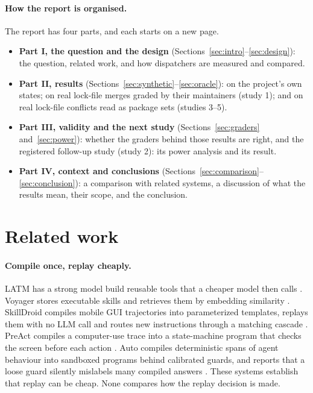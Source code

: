 \documentclass[11pt]{article}
\begin{document}
\paragraph{How the report is organised.}
The report has four parts, and each starts on a new page.
\begin{itemize}
  \item \textbf{Part I, the question and the design} (Sections~\ref{sec:intro}--\ref{sec:design}):
  the question, related work, and how dispatchers are measured and compared.
  \item \textbf{Part II, results} (Sections~\ref{sec:synthetic}--\ref{sec:oracle}): on the
  project's own states; on real lock-file merges graded by their maintainers (study 1); and on
  real lock-file conflicts read as package sets (studies 3--5).
  \item \textbf{Part III, validity and the next study} (Sections~\ref{sec:graders}
  and~\ref{sec:power}): whether the graders behind those results are right, and the registered
  follow-up study (study 2): its power analysis and its result.
  \item \textbf{Part IV, context and conclusions} (Sections~\ref{sec:comparison}--\ref{sec:conclusion}):
  a comparison with related systems, a discussion of what the results mean, their scope, and the
  conclusion.
\end{itemize}

\section{Related work}
\label{sec:related}

\paragraph{Compile once, replay cheaply.}
LATM has a strong model build reusable tools that a cheaper model then calls \cite{cai2024latm}.
Voyager stores executable skills and retrieves them by embedding similarity
\cite{wang2023voyager}. SkillDroid compiles mobile GUI trajectories into parameterized templates,
replays them with no LLM call and routes new instructions through a matching cascade
\cite{chen2026skilldroid}. PreAct compiles a computer-use trace into a state-machine program that
checks the screen before each action \cite{li2026preact}. Auto compiles deterministic spans of
agent behaviour into sandboxed programs behind calibrated guards, and reports that a loose guard
silently mislabels many compiled answers \cite{jaber2026auto}. These systems establish that
replay can be cheap. None compares how the replay decision is made.
\end{document}
